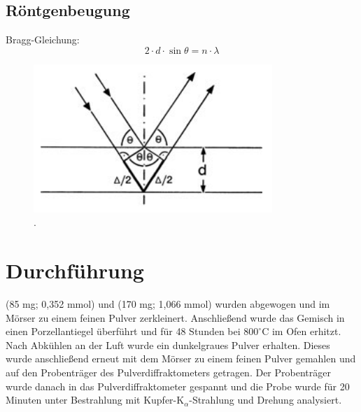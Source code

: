 \documentclass[a4paper,12pt,bibliography=totocnumbered]{scrartcl}
\begin{document}
\subsection{Röntgenbeugung}

Bragg-Gleichung:
\begin{equation}
    2 \cdot d \cdot \sin \theta = n \cdot \lambda
    \label{Bragg}
\end{equation}

\begin{figure}[H]
    \centering
    \includegraphics[scale=0.95]{Bilder/Bragg.png}
    \caption{. \cite{Kristallgitter}}
    \label{fig: Bragg}
\end{figure}

\newpage

\section{Durchführung}
(85 mg; 0,352 mmol) und (170 mg; 1,066 mmol) wurden abgewogen und im Mörser zu einem feinen Pulver zerkleinert. 
Anschließend wurde das Gemisch in einen Porzellantiegel überführt und für 48 Stunden bei $800 ^\circ$C im Ofen erhitzt.\\
Nach Abkühlen an der Luft wurde ein dunkelgraues Pulver erhalten. 
Dieses wurde anschließend erneut mit dem Mörser zu einem feinen Pulver gemahlen und auf den Probenträger des Pulverdiffraktometers getragen. 
Der Probenträger wurde danach in das Pulverdiffraktometer gespannt und die Probe wurde für 20 Minuten unter Bestrahlung mit Kupfer-K$_\alpha$-Strahlung und Drehung analysiert.
\end{document}
